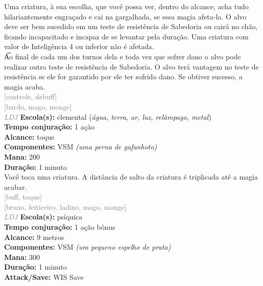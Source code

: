 \documentclass{RPG_Adventure}[2021/10/20]
\begin{document}
{\normalsize Uma criatura, à sua escolha, que você possa ver, dentro do alcance, acha tudo hilariantemente engraçado e cai na gargalhada, se essa magia afeta-la. O alvo deve ser bem sucedido em um teste de resistência de Sabedoria ou cairá no chão, ficando incapacitado e incapaz de se levantar pela duração. Uma criatura com valor de Inteligência 4 ou inferior não é afetada.\\\t Ao final de cada um dos turnos dela e toda vez que sofrer dano o alvo pode realizar outro teste de resistência de Sabedoria. O alvo terá vantagem no teste de resistência se ele for garantido por ele ter sofrido dano. Se obtiver sucesso, a magia acaba.\\}
{\scriptsize \textcolor{gray}{[controle, debuff]\\}}
{\scriptsize \textcolor{gray}{[bardo, mago, monge]\\}}
{\tiny \textcolor{gray}{\textit{LDJ}}}
{\small \t \textbf{Escola(s):} elemental (\textit{água, terra, ar, luz, relâmpago, metal})\\\t \textbf{Tempo conjuração:} 1 ação\\\t \textbf{Alcance:} toque\\\t \textbf{Componentes:} VSM \textit{(uma perna de gafanhoto)}\\\t \textbf{Mana:} 200\\\t \textbf{Duração:} 1 minuto\\}
{\normalsize Você toca uma criatura. A distância de salto da criatura é triplicada até a magia acabar.\\}
{\scriptsize \textcolor{gray}{[buff, toque]\\}}
{\scriptsize \textcolor{gray}{[bruxo, feiticeiro, ladino, mago, monge]\\}}
{\tiny \textcolor{gray}{\textit{LDJ}}}
{\small \t \textbf{Escola(s):} psíquica\\\t \textbf{Tempo conjuração:} 1 ação bônus\\\t \textbf{Alcance:} 9 metros\\\t \textbf{Componentes:} VSM \textit{(um pequeno espelho de prata)}\\\t \textbf{Mana:} 300\\\t \textbf{Duração:} 1 minuto\\\t \textbf{Attack/Save:} WIS Save\\}
\end{document}
